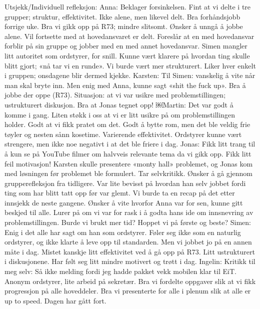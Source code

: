 Utsjekk/Individuell refleksjon:
Anna:
Beklager forsinkelsen. Fint at vi delte i tre grupper; struktur, effektivitet. Ikke alene, men likevel delt. Bra forhåndsjobb forrige uke. Bra vi gikk opp på R73; mindre slitsomt. Ønsker å unngå å jobbe alene. Vil fortsette med at hovedansvaret er delt. Foreslår at en med hovedansvar forblir på sin gruppe og jobber med en med annet hovedansvar. Simen mangler litt autoritet som ordstyrer, for snill. Kunne vært klarere på hvordan ting skulle blitt gjort; «nå tar vi en runde». Vi burde vært mer strukturert. Liker hver enkelt i gruppen; onsdagene blir dermed kjekke.
Karsten:
Til Simen: vanskelig å vite når man skal bryte inn. Men enig med Anna, kunne sagt «shit the fuck up». Bra å jobbe der oppe (R73). Situasjon: at vi var usikre med problemstillingen; ustrukturert diskusjon. Bra at Jonas tegnet opp!
￼Martin:
Det var godt å komme i gang. Liten støkk i oss at vi er litt usikre på om problemstillingen holder. Godt at vi fikk pratet om det. Godt å bytte rom, men det ble veldig frie tøyler og nesten sånn kosetime. Varierende effektivitet. Ordstyrer kunne vært strengere, men ikke noe negativt i at det ble friere i dag.
Jonas:
Fikk litt trang til å kun se på YouTube filmer om halvveis relevante tema da vi gikk opp. Fikk litt feil motivasjon! Karsten skulle presentere «monty hall» problemet, og Jonas kom med løsningen før problemet ble formulert. Tar selvkritikk. Ønsker å gå gjennom grupperefleksjon fra tidligere. Var lite bevisst på hvordan han selv jobbet fordi ting som har blitt tatt opp før var glemt. Vi burde ta en recap på det etter innsjekk de neste gangene. Ønsker å vite hvorfor Anna var for sen, kunne gitt beskjed til alle. Lurer på om vi var for rask i å godta hans ide om innsnevring av problemstillingen. Burde vi brukt mer tid? Hoppet vi på første og beste?
Simen:
Enig i det alle har sagt om han som ordstyrer. Føler seg ikke som en naturlig ordstyrer, og ikke klarte å leve opp til standarden. Men vi jobbet jo på en annen måte i dag. Mistet kanskje litt effektivitet ved å gå opp på R73. Litt ustrukturert i diskusjonene. Har følt seg litt mindre motivert og trøtt i dag.
Ingelin:
Kritikk til meg selv: Så ikke melding fordi jeg hadde pakket vekk mobilen klar til EiT. Anonym ordstyrer, lite arbeid på sekretær. Bra vi fordelte oppgaver slik at vi fikk progressjon på alle hoveddeler. Bra vi presenterte for alle i plenum slik at alle er up to speed. Dagen har gått fort.


